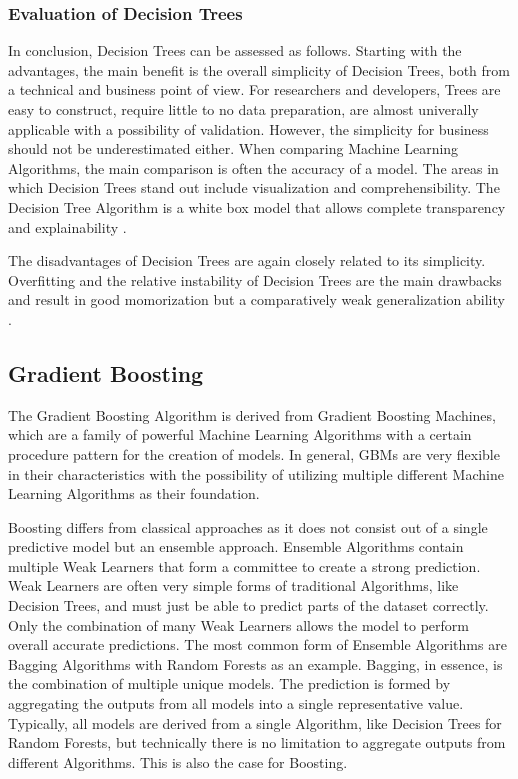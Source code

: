 \subsubsection{Evaluation of Decision Trees}

In conclusion, Decision Trees can be assessed as follows. Starting with the advantages,
the main benefit is the overall simplicity of Decision Trees, both from a technical and 
business point of view. For researchers and developers, Trees are easy to construct, require little
to no data preparation, are almost univerally applicable with a possibility of validation. 
However, the simplicity for business should not be underestimated either. When comparing Machine
Learning Algorithms, the main comparison is often the accuracy of a model. The areas in which 
Decision Trees stand out include visualization and comprehensibility. The Decision Tree Algorithm 
is a white box model that allows complete transparency and explainability \cite[p.339]{James2021} \cite[10.10.]{sklearn Decision Trees}. 

The disadvantages of Decision Trees are again closely related to its simplicity. Overfitting and 
the relative instability of Decision Trees are the main drawbacks and result in good momorization 
but a comparatively weak generalization ability \cite[p.339]{James2021} \cite[10.10.]{sklearn Decision Trees}.

\subsection{Gradient Boosting}

The Gradient Boosting Algorithm is derived from Gradient Boosting Machines, which are a family of 
powerful Machine Learning Algorithms with a certain procedure pattern for the creation of models. 
In general, GBMs are very flexible in their characteristics with the possibility of utilizing 
multiple different Machine Learning Algorithms as their foundation.

Boosting differs from classical approaches as it does not consist out of a single predictive 
model but an ensemble approach. Ensemble Algorithms contain multiple Weak Learners that form a 
committee to create a strong prediction. Weak Learners are often very simple forms of traditional 
Algorithms, like Decision Trees, and must just be able to predict parts of the dataset correctly. 
Only the combination of many Weak Learners allows the model to perform overall accurate 
predictions. The most common form of Ensemble Algorithms are Bagging Algorithms with Random 
Forests as an example. Bagging, in essence, is the combination of multiple unique models. The 
prediction is formed by aggregating the outputs from all models into a single representative 
value. Typically, all models are derived from a single Algorithm, like Decision Trees for Random 
Forests, but technically there is no limitation to aggregate outputs from different Algorithms. 
This is also the case for Boosting. 

